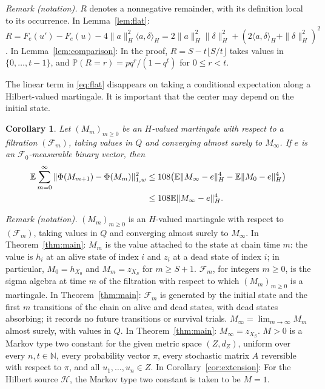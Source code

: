 \documentclass[11pt]{article}
\newtheorem{corollary}[theorem]{Corollary}
\theoremstyle{definition}
\theoremstyle{remark}
\numberwithin{equation}{section}
\newcommand{\N}{\mathbb N}
\newcommand{\E}{\mathbb E}
\newcommand{\Prob}{\mathbb P}
\newcommand{\calF}{\mathcal F}
\begin{document}
\noindent\textit{Remark (notation).} $R$ denotes a nonnegative remainder, with its definition local to its occurrence. In Lemma~\ref{lem:flat}: $R=F_e(u')-F_e(u)-4\|a\|_H^2\langle a,\delta\rangle_H=2\|a\|_H^2\|\delta\|_H^2+(2\langle a,\delta\rangle_H+\|\delta\|_H^2)^2$. In Lemma~\ref{lem:comparison}: In the proof, $R=S-t\lfloor S/t\rfloor$ takes values in $\{0,\ldots,t-1\}$, and $\Prob(R=r)=pq^r/(1-q^t)$ for $0\leq r<t$.


The linear term in \eqref{eq:flat} disappears on taking a
conditional expectation along a Hilbert-valued martingale. It is
important that the center may depend on the initial state.

\begin{corollary}\label{cor:martingale}
Let $(M_m)_{m\geq0}$ be an $H$-valued martingale with respect to
a filtration $(\calF_m)$, taking values in $Q$ and converging
almost surely to $M_\infty$. If $e$ is an
$\calF_0$-measurable binary vector, then
\begin{align}
 \E\sum_{m=0}^\infty
 \|\Phi(M_{m+1})-\Phi(M_m)\|_{1,w}^2
 &\leq108\bigl(\E\|M_\infty-e\|_H^4
                    -\E\|M_0-e\|_H^4\bigr)\notag\\
 &\leq108\E\|M_\infty-e\|_H^4.
 \label{eq:martingale-energy}
\end{align}
\end{corollary}

\noindent\textit{Remark (notation).} $(M_m)_{m\geq0}$ is an $H$-valued martingale with respect to $(\calF_m)$, taking values in $Q$ and converging almost surely to $M_\infty$. In Theorem~\ref{thm:main}: $M_m$ is the value attached to the state at chain time $m$: the value is $h_i$ at an alive state of index $i$ and $z_i$ at a dead state of index $i$; in particular, $M_0=h_{X_0}$ and $M_m=z_{X_S}$ for $m\geq S+1$. $\calF_m$, for integers $m\geq0$, is the sigma algebra at time $m$ of the filtration with respect to which $(M_m)_{m\geq0}$ is a martingale. In Theorem~\ref{thm:main}: $\calF_m$ is generated by the initial state and the first $m$ transitions of the chain on alive and dead states, with dead states absorbing; it records no future transitions or survival trials. $M_\infty=\lim_{m\to\infty}M_m$ almost surely, with values in $Q$. In Theorem~\ref{thm:main}: $M_\infty=z_{X_S}$. $M>0$ is a Markov type two constant for the given metric space $(Z,d_Z)$, uniform over every $n,t\in\N$, every probability vector $\pi$, every stochastic matrix $A$ reversible with respect to $\pi$, and all $u_1,\ldots,u_n\in Z$. In Corollary~\ref{cor:extension}: For the Hilbert source $\mathcal H$, the Markov type two constant is taken to be $M=1$.
\end{document}
